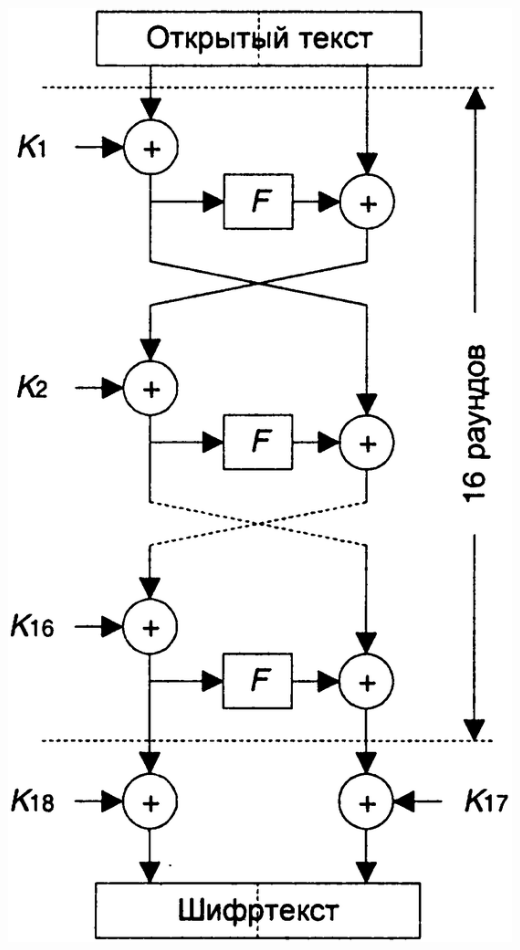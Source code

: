 \noindent
\begin{minipage}{\linewidth}
  \centering
  \vspace{3.5mm}
  \includegraphics[scale=0.2]{./pics/blowfish-structure.png}
  \label{fig:blowfish-structure}
  \vspace{3.5mm}
\end{minipage}

